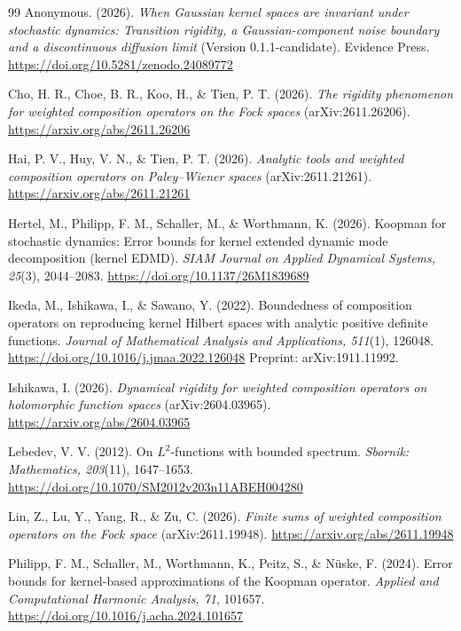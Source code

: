 \documentclass[11pt,a4paper]{article}
\theoremstyle{remark}
\begin{document}
\begin{thebibliography}{99}
Anonymous. (2026).
\emph{When Gaussian kernel spaces are invariant under stochastic
dynamics: Transition rigidity, a Gaussian-component noise boundary
and a discontinuous diffusion limit} (Version 0.1.1-candidate).
Evidence Press.
\url{https://doi.org/10.5281/zenodo.24089772}

Cho, H. R., Choe, B. R., Koo, H., \& Tien, P. T. (2026).
\emph{The rigidity phenomenon for weighted composition operators on the
Fock spaces} (arXiv:2611.26206).
\url{https://arxiv.org/abs/2611.26206}

Hai, P. V., Huy, V. N., \& Tien, P. T. (2026).
\emph{Analytic tools and weighted composition operators on
Paley--Wiener spaces} (arXiv:2611.21261).
\url{https://arxiv.org/abs/2611.21261}

Hertel, M., Philipp, F. M., Schaller, M., \& Worthmann, K. (2026).
Koopman for stochastic dynamics: Error bounds for kernel extended
dynamic mode decomposition (kernel EDMD).
\emph{SIAM Journal on Applied Dynamical Systems, 25}(3), 2044--2083.
\url{https://doi.org/10.1137/26M1839689}

Ikeda, M., Ishikawa, I., \& Sawano, Y. (2022).
Boundedness of composition operators on reproducing kernel
Hilbert spaces with analytic positive definite functions.
\emph{Journal of Mathematical Analysis and Applications, 511}(1), 126048.
\url{https://doi.org/10.1016/j.jmaa.2022.126048}
Preprint: arXiv:1911.11992.

Ishikawa, I. (2026).
\emph{Dynamical rigidity for weighted composition operators on
holomorphic function spaces} (arXiv:2604.03965).
\url{https://arxiv.org/abs/2604.03965}

Lebedev, V. V. (2012).
On $L^2$-functions with bounded spectrum.
\emph{Sbornik: Mathematics, 203}(11), 1647--1653.
\url{https://doi.org/10.1070/SM2012v203n11ABEH004280}

Lin, Z., Lu, Y., Yang, R., \& Zu, C. (2026).
\emph{Finite sums of weighted composition operators on the Fock space}
(arXiv:2611.19948).
\url{https://arxiv.org/abs/2611.19948}

Philipp, F. M., Schaller, M., Worthmann, K., Peitz, S., \&
N\"uske, F. (2024).
Error bounds for kernel-based approximations of the Koopman operator.
\emph{Applied and Computational Harmonic Analysis, 71}, 101657.
\url{https://doi.org/10.1016/j.acha.2024.101657}


\end{thebibliography}
\end{document}
